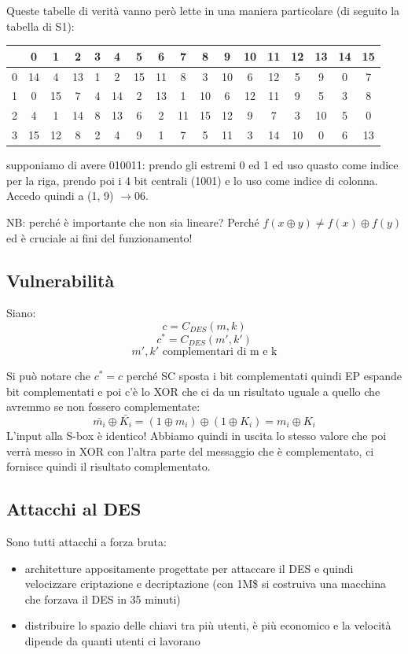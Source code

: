 Queste tabelle di verità vanno però lette in una maniera particolare (di seguito la tabella di S1):
\begin{table}[ht!]
    \centering
    \small
    \begin{tabular}{c|c c c c c c c c c c c c c c c c}
        & 0 & 1 & 2 & 3 & 4 & 5 & 6 & 7 & 8 & 9 & 10 & 11 & 12 & 13 & 14 & 15 \\
        \hline
        0 & 14 & 4 & 13 & 1 & 2 & 15 & 11 & 8 & 3 & 10 & 6 & 12 & 5 & 9 & 0 & 7 \\
        1 & 0 & 15 & 7 & 4 & 14 & 2 & 13 & 1 & 10 & 6 & 12 & 11 & 9 & 5 & 3 & 8 \\
        2 & 4 & 1 & 14 & 8 & 13 & 6 & 2 & 11 & 15 & 12 & 9 & 7 & 3 & 10 & 5 & 0 \\
        3 & 15 & 12 & 8 & 2 & 4 & 9 & 1 & 7 & 5 & 11 & 3 & 14 & 10 & 0 & 6 & 13 \\
    \end{tabular}
\end{table}
supponiamo di avere 010011: prendo gli estremi 0 ed 1 ed uso quasto come indice per la riga, prendo poi i 4 bit centrali (1001) e lo uso come indice di colonna. Accedo quindi a (1, 9) $\xrightarrow{} 06$.

NB: perché è importante che non sia lineare? Perché $f(x \oplus y) \neq f(x) \oplus f(y)$ ed è cruciale ai fini del funzionamento!

\subsection{Vulnerabilità}
Siano:
$$ c = C_{DES}(m, k) $$
$$ c^{*} = C_{DES}(m', k') $$
$$ m', k' \text{ complementari di m e k} $$

Si può notare che $c^{*} = c$ perché SC sposta i bit complementati quindi EP espande bit complementati e poi c'è lo XOR che ci da un risultato uguale a quello che avremmo se non fossero complementate:
$$ \bar{m_i} \oplus \bar{K_i} = (1 \oplus m_i) \oplus (1 \oplus K_i) = m_i \oplus K_i $$
L'input alla S-box è identico! Abbiamo quindi in uscita lo stesso valore che poi verrà messo in XOR con l'altra parte del messaggio che è complementato, ci fornisce quindi il risultato complementato.

\subsection{Attacchi al DES}
Sono tutti attacchi a forza bruta:
\begin{itemize}
    \item architetture appositamente progettate per attaccare il DES e quindi velocizzare criptazione e decriptazione (con 1M\$ si costruiva una macchina che forzava il DES in 35 minuti)
    \item distribuire lo spazio delle chiavi tra più utenti, è più economico e la velocità dipende da quanti utenti ci lavorano
\end{itemize}

